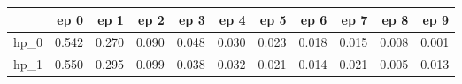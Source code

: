 \begin{tabular}{lrrrrrrrrrr}
\toprule
{} &   ep 0 &   ep 1 &   ep 2 &   ep 3 &   ep 4 &   ep 5 &   ep 6 &   ep 7 &   ep 8 &   ep 9 \\
\midrule
hp\_0 &  0.542 &  0.270 &  0.090 &  0.048 &  0.030 &  0.023 &  0.018 &  0.015 &  0.008 &  0.001 \\
hp\_1 &  0.550 &  0.295 &  0.099 &  0.038 &  0.032 &  0.021 &  0.014 &  0.021 &  0.005 &  0.013 \\
\bottomrule
\end{tabular}
